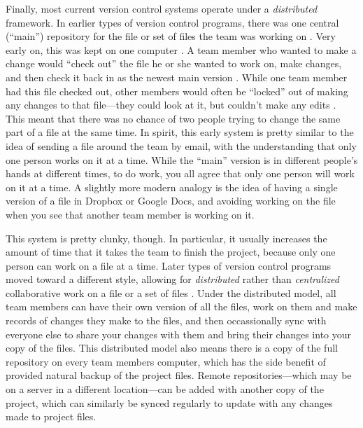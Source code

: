 \documentclass[]{tufte-book}
\begin{document}
Finally, most current version control systems operate under a \emph{distributed}
framework. In earlier types of version control programs, there was one central
(``main'') repository for the file or set of files the team was working on
\citep{raymondunderstanding, target2018version}. Very early on, this was kept on one
computer \citep{irving2011astonishments}. A team member who wanted to make a change
would ``check out'' the file he or she wanted to work on, make changes, and then
check it back in as the newest main version \citep{raymond2003art}. While one team
member had this file checked out, other members would often be ``locked'' out of
making any changes to that file---they could look at it, but couldn't make any
edits \citep{raymondunderstanding, target2018version}. This meant that there was no
chance of two people trying to change the same part of a file at the same time.
In spirit, this early system is pretty similar to the idea of sending a file
around the team by email, with the understanding that only one person works on
it at a time. While the ``main'' version is in different people's hands at
different times, to do work, you all agree that only one person will work on it
at a time. A slightly more modern analogy is the idea of having a single version
of a file in Dropbox or Google Docs, and avoiding working on the file when you
see that another team member is working on it.

This system is pretty clunky, though. In particular, it usually increases the
amount of time that it takes the team to finish the project, because only one
person can work on a file at a time. Later types of version control programs
moved toward a different style, allowing for \emph{distributed} rather than
\emph{centralized} collaborative work on a file or a set of files
\citep{raymondunderstanding, irving2011astonishments}. Under the distributed model,
all team members can have their own version of all the files, work on them and
make records of changes they make to the files, and then occassionally sync with
everyone else to share your changes with them and bring their changes into your
copy of the files. This distributed model also means there is a copy of the full
repository on every team members computer, which has the side benefit of
provided natural backup of the project files. Remote repositories---which may be
on a server in a different location---can be added with another copy of the
project, which can similarly be synced regularly to update with any changes made
to project files.
\end{document}
